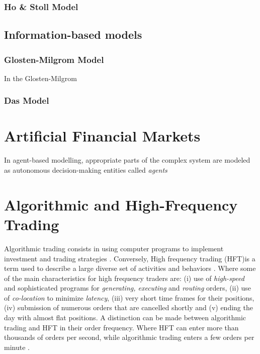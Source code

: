 \documentclass{kththesis}
\theoremstyle{definition}
\begin{document}
\subsubsection*{Ho \& Stoll Model}

\subsection{Information-based models}

\subsubsection*{Glosten-Milgrom Model}
In the Glosten-Milgrom 

\subsubsection*{Das Model}


\section{Artificial Financial Markets}
In agent-based modelling, appropriate parts of the complex system are modeled as autonomous decision-making entities called \textit{agents} \parencite{darley2007nasdaq}


\section{Algorithmic and High-Frequency Trading}
Algorithmic trading consists in using computer programs to implement investment and trading strategies \parencite{abergel2012market}. Conversely, High frequency trading (HFT)is a term used to describe a large diverse set of activities and behaviors \parencite{o2015high}. Where some of the main characteristics for high frequency traders are: (i) use of \textit{high-speed} and sophisticated programs for \textit{generating, executing} and \textit{routing} orders, (ii) use of \textit{co-location} to minimize \textit{latency}, (iii) very short time frames for their positions, (iv) submission of numerous orders that are cancelled shortly and (v) ending the day with almost flat positions. 
\newline
\newline
A distinction can be made between algorithmic trading and HFT in their order frequency. Where HFT can enter more than thousands of orders per second, while algorithmic trading enters a few orders per minute \parencite{abergel2012market}.
\end{document}
